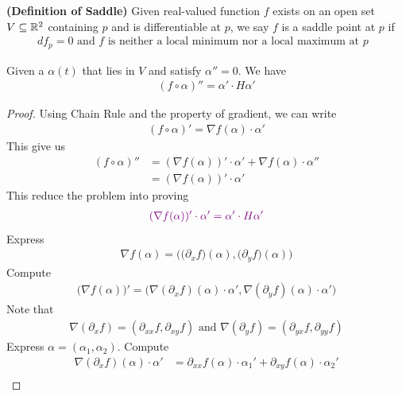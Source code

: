 \documentclass{report}
\begin{document}
\begin{definition}
\textbf{(Definition of Saddle)} Given real-valued function $f$ exists on an open set $V\subseteq \mathbb{R}^2$ containing $p$ and is differentiable at  $p$, we say $f$ is a saddle point at $p$ if 
 \begin{align*}
df_p=0\text{ and }f\text{ is neither a local minimum nor a local maximum at $p$ }
\end{align*}
\end{definition}
\begin{lemma}
\label{5102}
Given a $\alpha (t)$ that lies in $V$ and satisfy $\alpha ''=0$. We have 
 \begin{align*}
   (f\circ \alpha )''=\alpha '\cdot H\alpha '
\end{align*}
\end{lemma}
\begin{proof}
Using Chain Rule and the property of gradient, we can write
\begin{align*}
  (f\circ \alpha )'= \nabla f(\alpha )\cdot \alpha '
\end{align*}
This give us  
\begin{align*}
  (f\circ \alpha )''&= (\nabla f(\alpha ))' \cdot \alpha ' + \nabla f(\alpha )\cdot \alpha ''\\
  &=(\nabla f(\alpha ))' \cdot \alpha '
\end{align*}
This reduce the problem into proving 
\begin{align*}
\textcolor{violet}{(\nabla f(\alpha ))'\cdot \alpha '=\alpha '\cdot H \alpha '}
\end{align*}
Express 
\begin{align*}
\nabla f(\alpha )=\Big( \big(\partial _x f\big)(\alpha ) , \big(\partial _yf\big)(\alpha )   \Big)
\end{align*}
Compute 
\begin{align*}
  \big(\nabla f(\alpha )\big)'=\Big( \nabla (\partial _x f)(\alpha ) \cdot \alpha ', \nabla  (\partial_y f)(\alpha )\cdot \alpha '  \Big)
\end{align*}
Note that 
\begin{align*}
\nabla (\partial _x f)=(\partial_{x x}f, \partial_{xy}f)\text{ and }\nabla (\partial_y f)=(\partial_ {yx}f, \partial_{yy}f)
\end{align*}
Express  $\alpha =(\alpha _1, \alpha _2)$. Compute 
\begin{align*}
\nabla (\partial_x f)(\alpha )\cdot \alpha ' &= \partial_{x x}f(\alpha )\cdot \alpha_1' + \partial_{xy} f(\alpha )\cdot \alpha_2' \\

\end{align*}
\end{proof}
\end{document}
